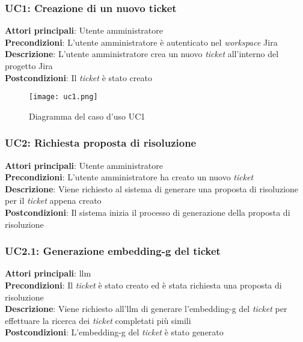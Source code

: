 \subsubsection{UC1: Creazione di un nuovo ticket}
\textbf{Attori principali}: Utente amministratore \\
\textbf{Precondizioni}: L'utente amministratore è autenticato nel \textit{workspace} Jira\\
\textbf{Descrizione}: L'utente amministratore crea un nuovo \textit{ticket} all'interno del progetto Jira \\
\textbf{Postcondizioni}: Il \textit{ticket} è stato creato \\
\begin{figure}[H]
    \centering
    \texttt{[image: uc1.png]}
    \caption{Diagramma del caso d'uso UC1}
    \label{fig:UC1}
\end{figure}
\subsubsection{UC2: Richiesta proposta di risoluzione}
\textbf{Attori principali}: Utente amministratore \\
\textbf{Precondizioni}: L'utente amministratore ha creato un nuovo \textit{ticket} \\
\textbf{Descrizione}: Viene richiesto al sistema di generare una proposta di risoluzione per il \textit{ticket} appena creato \\
\textbf{Postcondizioni}: Il sistema inizia il processo di generazione della proposta di risoluzione \\

\subsubsection{UC2.1: Generazione \gls{embedding-g} del ticket}
\textbf{Attori principali}: \gls{llm} \\
\textbf{Precondizioni}: Il \textit{ticket} è stato creato ed è stata richiesta una proposta di risoluzione \\
\textbf{Descrizione}: Viene richiesto all'\gls{llm} di generare l'\gls{embedding-g} del \textit{ticket} per effettuare la ricerca dei \textit{ticket} completati più simili \\
\textbf{Postcondizioni}: L'\gls{embedding-g} del \textit{ticket} è stato generato \\


